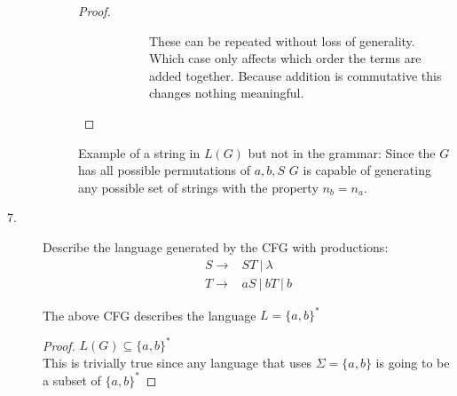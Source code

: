\documentclass{article}
\begin{document}
\begin{description}
\begin{description}
\begin{proof}
\begin{description}
\begin{description}
          These can be repeated without loss of generality. Which case only affects which order the terms are added together. Because addition is commutative this changes nothing meaningful.
        \end{description}
      \end{description}
    \end{proof}
    Example of a string in $L(G)$ but not in the grammar: Since the $G$ has all possible permutations of $a,b,S$ $G$ is capable of generating any possible set of strings with the property $n_b = n_a$. 
  \end{description}
\item[7.]
  Describe the language generated by the CFG with productions:
  \begin{align*}
    S \rightarrow& ST ~|~ \lambda\\
    T \rightarrow& aS ~|~ bT ~|~ b
  \end{align*}


  The above CFG describes the language $L = \{a,b\}^*$\\


  \begin{proof}  $L(G) \subseteq \{a,b\}^*$\\
    This is trivially true since any language that uses $\Sigma = \{a,b\}$ is going to be a subset of $\{a,b\}^*$
  \end{proof}


\end{description}
\end{document}
